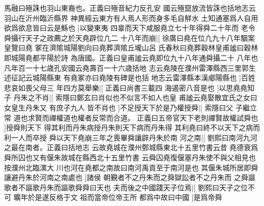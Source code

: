 馬融曰殛誅也羽山東裔也。正義曰殛音紀力反孔安%
國云殛竄放流皆誅也括地志云羽山在沂州臨沂縣界%
%
神異經云東方有人焉人形而身多毛自觧水%
土知通塞爲人自用欲爲欲息皆曰云是鯀也%
]以變東夷%
%
四辠而天下咸服堯立七十年得舜二十年而%
%
老令舜攝行天子之政薦之於天堯辟位凢二%
%
十八年而崩|[%
徐廣曰堯在位凢九十八年駰案皇覽曰堯%
冢在濟隂城陽劉向曰堯葬濟隂丘壠山呂%
%
氏春秋曰堯葬穀林皇甫謐曰穀林即城陽堯都平陽於詩%
為唐國。正義曰皇甫謐云堯即位九十八年通舜攝二十%
%
八年也凡年百一十七歳孔安國云堯壽百一十六歳括地%
志云堯陵在濮州雷澤縣西三里郭生述征記云城陽縣東%
%
有堯冢亦曰堯陵有碑是也括%
地志云雷澤縣本漢郕陽縣也%
]百姓悲哀如喪父母三%
%
年四方莫舉樂|[%
正義曰尚書三載四%
海遏密八音是也%
]以思堯堯知子%
%
丹朱之不肖|[%
索隱曰鄭玄曰肖似也不似言不如人也皇%
甫謐云堯娶散宜氏之女曰女皇生丹朱又%
%
有庶子九人%
皆不肖也%
]不足授天下於是乃權授舜|[%
索隱曰父%
子繼立常%
%
道也求賢而禪權道也權者反常而合道。%
正義曰五帝官天下老則禪賢故權試舜也%
]授舜則天下%
%
得其利而丹朱病授丹朱則天下病而丹朱得%
%
其利堯曰終不以天下之病而利一人而卒授%
%
舜以天下堯崩三年之喪畢舜讓辟丹朱於南%
%
河之南|[%
劉熙曰南河九河之最在南者。正義曰括地志%
云故堯城在濮州鄄城縣東北十五里竹書云昔%
%
堯德衰爲舜所囚也又有偃朱故城在縣西北十五里竹書%
云舜囚堯復偃塞丹朱使不與父相見也按濮州北臨漯大%
%
川也河在堯都之南故曰南河禹貢至于南河是也%
其偃朱城所居即舜讓避丹朱於河南之南處也%
]諸侯%
%
朝覲者不之丹朱而之舜獄訟者不之丹朱而%
%
之舜謳歌者不謳歌丹朱而謳歌舜舜曰天也%
%
夫而後之中國踐天子位焉|[%
劉熙曰天子之位不可%
曠年於是遂反格于文%
%
祖而當帝位帝王所%
都爲中故曰中國%
]是爲帝舜%
